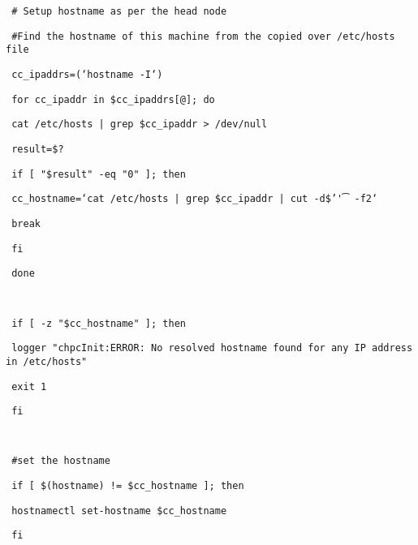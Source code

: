 \documentclass[12pt]{article}
\begin{document}
\begin{bash}\texttt{\small{ \# Setup hostname as per the head node}}\end{bash}
\begin{bash}\texttt{\small{ \#Find the hostname of this machine from the copied over /etc/hosts file}}\end{bash}
\begin{bash}\texttt{\small{ cc\_ipaddrs=(`hostname -I`)}}\end{bash}
\begin{bash}\texttt{\small{ for cc\_ipaddr in \${cc\_ipaddrs[@]}; do}}\end{bash}
\begin{bash}\texttt{\small{     cat /etc/hosts | grep \${cc\_ipaddr} > /dev/null}}\end{bash}
\begin{bash}\texttt{\small{     result=\$?}}\end{bash}
\begin{bash}\texttt{\small{     if [ "\$result" -eq "0" ]; then}}\end{bash}
\begin{bash}\texttt{\small{         cc\_hostname=`cat /etc/hosts | grep \${cc\_ipaddr} | cut -d\$'\t' -f2`}}\end{bash}
\begin{bash}\texttt{\small{         break}}\end{bash}
\begin{bash}\texttt{\small{     fi}}\end{bash}
\begin{bash}\texttt{\small{ done}}\end{bash}
\begin{bash}\texttt{\small{ }}\end{bash}
\begin{bash}\texttt{\small{ if [ -z "\${cc\_hostname}" ]; then}}\end{bash}
\begin{bash}\texttt{\small{     logger "chpcInit:ERROR: No resolved hostname found for any IP address in /etc/hosts"}}\end{bash}
\begin{bash}\texttt{\small{     exit 1}}\end{bash}
\begin{bash}\texttt{\small{ fi}}\end{bash}
\begin{bash}\texttt{\small{ }}\end{bash}
\begin{bash}\texttt{\small{ \#set the hostname}}\end{bash}
\begin{bash}\texttt{\small{ if [ \$(hostname) != \${cc\_hostname} ]; then}}\end{bash}
\begin{bash}\texttt{\small{     hostnamectl set-hostname \${cc\_hostname}}}\end{bash}
\begin{bash}\texttt{\small{ fi}}\end{bash}
\end{document}
